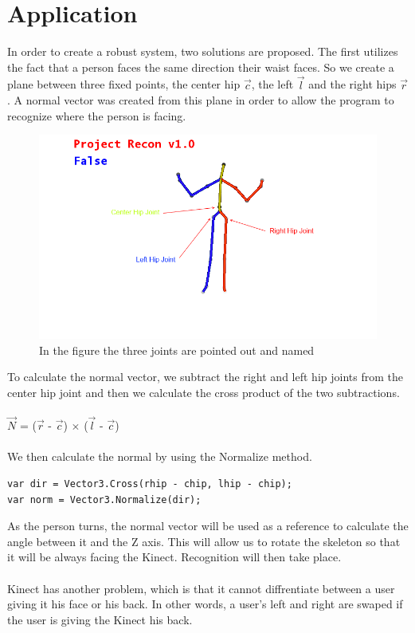 \chapter{Application}\label{chap:application}
In order to create a robust system, two solutions are proposed. The first utilizes the fact that a person faces 
the same direction their waist faces. So we create a plane between three fixed 
points, the center hip $\vec{c}$, the left $\vec{l}$ and the right hips $\vec{r}$. A normal vector \N was created 
from this plane in order to allow the program to recognize where the person is 
facing.

\begin{figure}[!htbp]
\centering
\includegraphics[width=1\textwidth]{images/skeleton_frame3.png}
\caption{In the figure the three joints are pointed out and named}
\label{skeletonframe3}
\end{figure}

To calculate the normal vector, we subtract the right and left hip joints from 
the center hip joint and then we calculate the cross product of the two 
subtractions.
\\
\\
$\vec{N}$ = ($\vec{r}$ - $\vec{c}$) $\times$ ($\vec{l}$ - $\vec{c}$)
\\
\\
We then calculate the normal by using the Normalize method.
\begin{verbatim}
var dir = Vector3.Cross(rhip - chip, lhip - chip);
var norm = Vector3.Normalize(dir);
\end{verbatim}
As the person turns, the normal vector will be used as a reference to calculate the angle between it and the Z axis. This will allow us to rotate the skeleton so that it will be always facing the Kinect. Recognition will then take place.
\\
\\
Kinect has another problem, which is that it cannot diffrentiate between a user giving it his face or his back. In other words, a user's left and right are swaped if the user is giving the Kinect his back.

